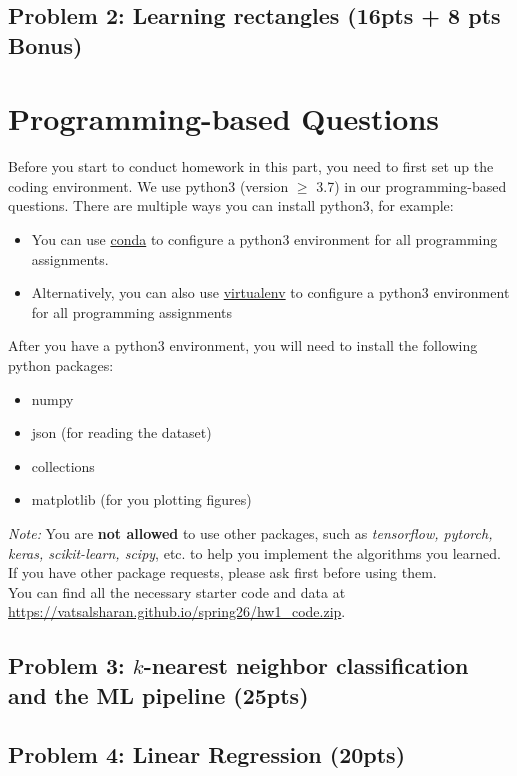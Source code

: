 \documentclass{article}
\newcommand{\blue}[1]{{\color{blue}#1}}
\newcommand{\pink}[1]{{\color{magenta}#1}}
\begin{document}
\subsection*{Problem 2: Learning rectangles (\blue{16pts + 8 pts Bonus})}


\clearpage

\section*{Programming-based Questions}


Before you start to conduct homework in this part, you need to first set up the coding environment. We use python3 (version $\geq$ 3.7) in our programming-based questions. There are multiple ways you can install python3, for example:
\begin{itemize}[topsep=5pt, itemsep=-2pt]
    \item You can use \href{https://docs.conda.io/en/latest/}{\pink{conda}} to configure a python3 environment for all programming assignments.
    \item Alternatively, you can also use \href{https://virtualenv.pypa.io/en/stable/}{\pink{virtualenv}} to configure a python3 environment for all programming assignments
\end{itemize}

After you have a python3 environment, you will need to install the following python packages:
\begin{itemize}[topsep=5pt, itemsep=-2pt]
    \item numpy
    \item json (for reading the dataset)
    \item collections
    \item matplotlib (for you plotting figures)
\end{itemize}

\emph{Note:} You are \textbf{not allowed} to use other packages, such as \emph{tensorflow, pytorch, keras, scikit-learn, scipy}, etc. to help you implement the algorithms you learned. If you have other package requests, please ask first before using them.\\

 You can find all the necessary starter code and data at \url{https://vatsalsharan.github.io/spring26/hw1_code.zip}.

\subsection*{Problem 3: $k$-nearest neighbor classification and the ML pipeline (\blue{25pts})}
     
\subsection*{Problem 4: Linear Regression (\blue{20pts})}
    
\end{document}
